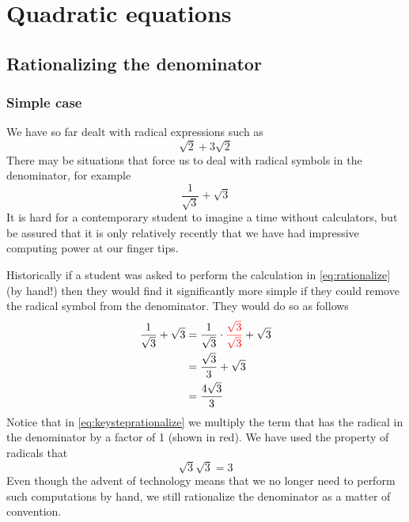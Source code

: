 \chapter{Quadratic equations}
\minitoc
\section{Rationalizing the denominator}
\subsection{Simple case}
%
We have so far dealt with radical expressions such as
\[
	\sqrt{2} + 3\sqrt{2}
\]
There may be situations that force us to deal with radical symbols in the denominator, for example
\begin{equation}\label{eq:rationalize}
	\frac{1}{\sqrt{3}} + \sqrt{3}
\end{equation}
It is hard for a contemporary student to imagine a time without calculators, but be assured that 
it is only relatively recently that we have had impressive computing power at our finger tips. 

Historically if a student was asked to perform the calculation in \cref{eq:rationalize}
(by hand!) then they would find it significantly more simple if they could remove the radical symbol from the denominator. They would do so
as follows
\begin{align}
	\frac{1}{\sqrt{3}} + \sqrt{3} & =  \frac{1}{\sqrt{3}}\cdot {\color{red}\frac{\sqrt{3}}{\sqrt{3}}} + \sqrt{3}\label{eq:keysteprationalize} \\
	                              & =  \frac{\sqrt{3}}{3}+\sqrt{3} 	\nonumber                                                                 \\	
	                              & =  \frac{4\sqrt{3}}{3}\nonumber                                                                           
\end{align}
Notice that in \cref{eq:keysteprationalize} we multiply the term that has the radical in the denominator by a \gls{factor} of 1 (shown in red). We have used
the property of radicals that
\[
	\sqrt{3}\sqrt{3} = 3
\]
Even though the advent of technology means that we no longer need to perform such computations by hand, we still rationalize
the denominator as a matter of convention.

